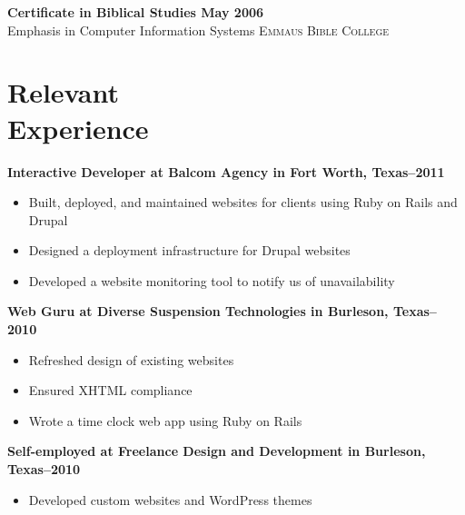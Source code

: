 \documentclass[margin]{res}
\newcommand{\sectionspace}{\vspace{10pt}}
\begin{document}
\begin{resume}
                \textbf{Certificate in Biblical Studies \dotfill May 2006 }  \\
                Emphasis in Computer Information Systems \hfill  \textsc{Emmaus Bible College}
              
\sectionspace


\section{Relevant \\ Experience}

              
                \textbf{Interactive Developer
                 at Balcom Agency in Fort Worth, Texas--2011}
                 \vspace{-10pt}\begin{itemize} \itemsep -2pt %
                   \item Built, deployed, and maintained websites for clients using Ruby on Rails and Drupal
                 
                   \item Designed a deployment infrastructure for Drupal websites
                 
                   \item Developed a website monitoring tool to notify us of unavailability
                 \end{itemize}
              
                \textbf{Web Guru
                 at Diverse Suspension Technologies in Burleson, Texas--2010}
                 \vspace{-10pt}\begin{itemize} \itemsep -2pt %
                   \item Refreshed design of existing websites
                 
                   \item Ensured XHTML compliance
                 
                   \item Wrote a time clock web app using Ruby on Rails
                 \end{itemize}
              
                \textbf{Self-employed
                 at Freelance Design and Development in Burleson, Texas--2010}
                 \vspace{-10pt}\begin{itemize} \itemsep -2pt %
                   \item Developed custom websites and WordPress themes
                 

\end{itemize}
\end{resume}
\end{document}
